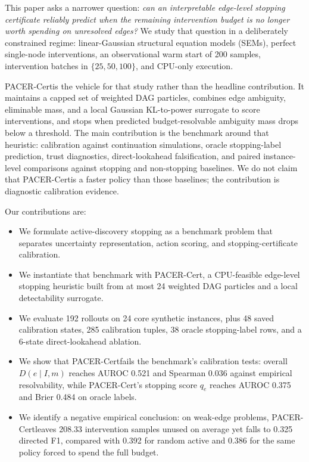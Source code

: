 \documentclass{article}
\newcommand{\method}{PACER-Cert}
\newcommand{\qe}{q_e}
\newcommand{\de}{D}
\begin{document}
This paper asks a narrower question: \emph{can an interpretable edge-level stopping certificate reliably predict when the remaining intervention budget is no longer worth spending on unresolved edges?} We study that question in a deliberately constrained regime: linear-Gaussian structural equation models (SEMs), perfect single-node interventions, an observational warm start of 200 samples, intervention batches in $\{25,50,100\}$, and CPU-only execution.

\method is the vehicle for that study rather than the headline contribution. It maintains a capped set of weighted DAG particles, combines edge ambiguity, eliminable mass, and a local Gaussian KL-to-power surrogate to score interventions, and stops when predicted budget-resolvable ambiguity mass drops below a threshold. The main contribution is the benchmark around that heuristic: calibration against continuation simulations, oracle stopping-label prediction, trust diagnostics, direct-lookahead falsification, and paired instance-level comparisons against stopping and non-stopping baselines. We do not claim that \method is a faster policy than those baselines; the contribution is diagnostic calibration evidence.

Our contributions are:
\begin{itemize}
  \item We formulate active-discovery stopping as a benchmark problem that separates uncertainty representation, action scoring, and stopping-certificate calibration.
  \item We instantiate that benchmark with \method, a CPU-feasible edge-level stopping heuristic built from at most 24 weighted DAG particles and a local detectability surrogate.
  \item We evaluate 192 rollouts on 24 core synthetic instances, plus 48 saved calibration states, 285 calibration tuples, 38 oracle stopping-label rows, and a 6-state direct-lookahead ablation.
  \item We show that \method fails the benchmark's calibration tests: overall $\de(e\mid I,m)$ reaches AUROC 0.521 and Spearman 0.036 against empirical resolvability, while \method's stopping score $\qe$ reaches AUROC 0.375 and Brier 0.484 on oracle labels.
  \item We identify a negative empirical conclusion: on weak-edge problems, \method leaves 208.33 intervention samples unused on average yet falls to 0.325 directed F1, compared with 0.392 for random active and 0.386 for the same policy forced to spend the full budget.
\end{itemize}
\end{document}
